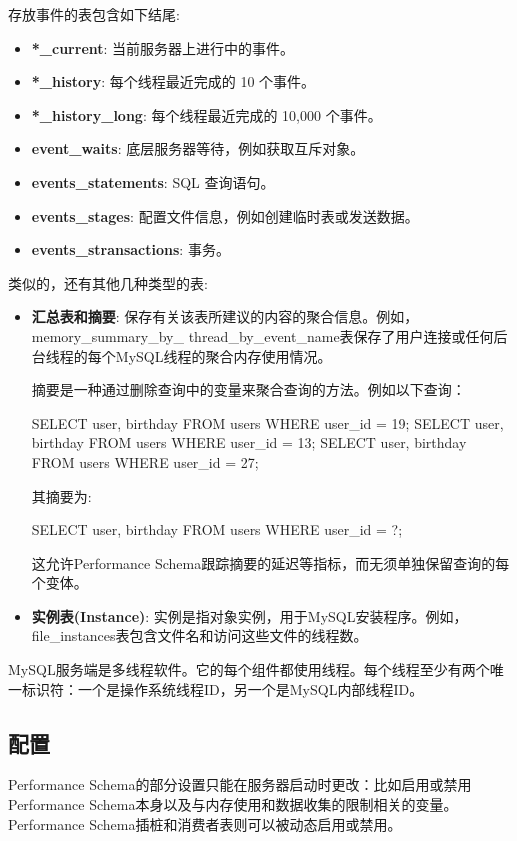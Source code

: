 存放事件的表包含如下结尾:
\begin{itemize}
    \item \textbf{*\_current}: 当前服务器上进行中的事件。
    \item \textbf{*\_history}: 每个线程最近完成的 10 个事件。
    \item \textbf{*\_history\_long}: 每个线程最近完成的 10,000 个事件。
    \item \textbf{event\_waits}: 底层服务器等待，例如获取互斥对象。
    \item \textbf{events\_statements}: SQL 查询语句。
    \item \textbf{events\_stages}: 配置文件信息，例如创建临时表或发送数据。
    \item \textbf{events\_stransactions}: 事务。
\end{itemize}

类似的，还有其他几种类型的表:
\begin{itemize}
    \item \textbf{汇总表和摘要}: 保存有关该表所建议的内容的聚合信息。例如，memory\_summary\_by\_ thread\_by\_event\_name表保存了用户连接或任何后台线程的每个MySQL线程的聚合内存使用情况。
    
    摘要是一种通过删除查询中的变量来聚合查询的方法。例如以下查询：
\begin{sql}
SELECT user, birthday FROM users WHERE user_id = 19;
SELECT user, birthday FROM users WHERE user_id = 13;
SELECT user, birthday FROM users WHERE user_id = 27;
\end{sql}

    其摘要为:
\begin{sql}
SELECT user, birthday FROM users WHERE user_id = ?;
\end{sql}

    这允许Performance Schema跟踪摘要的延迟等指标，而无须单独保留查询的每个变体。
    \item \textbf{实例表(Instance)}: 实例是指对象实例，用于MySQL安装程序。例如，file\_instances表包含文件名和访问这些文件的线程数。
\end{itemize}

MySQL服务端是多线程软件。它的每个组件都使用线程。每个线程至少有两个唯一标识符：一个是操作系统线程ID，另一个是MySQL内部线程ID。

\subsection{配置}

Performance Schema的部分设置只能在服务器启动时更改：比如启用或禁用Performance Schema本身以及与内存使用和数据收集的限制相关的变量。Performance Schema插桩和消费者表则可以被动态启用或禁用。

